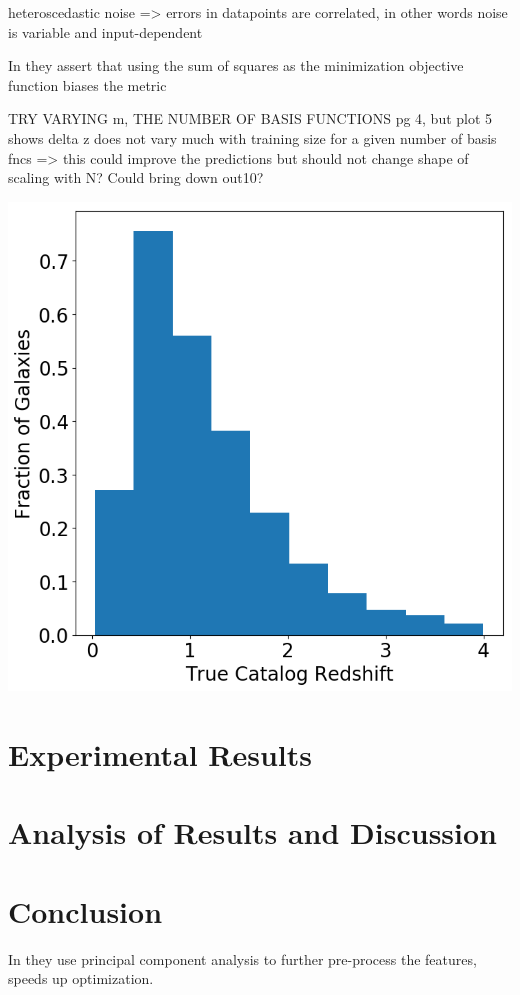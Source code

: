 \documentclass[13pt]{amsart}
\begin{document}
    heteroscedastic noise => errors in datapoints are correlated, in other words noise is variable and input-dependent

    In \cite{sgp} they assert that using the sum of squares as the minimization objective function biases the metric

    TRY VARYING m, THE NUMBER OF BASIS FUNCTIONS \cite{sgp} pg 4, but plot 5 shows delta z does not vary much with training size for a given number of basis fncs => this could improve the predictions but should not change shape of scaling with N? Could bring down out10?

    \includegraphics[width=1.\textwidth]{../plots/figure_true_redshift_histogram.png}



\section{Experimental Results}




\section{Analysis of Results and Discussion}



\section{Conclusion}
In \cite{gpz} they use principal component analysis to further pre-process the features, speeds up optimization.




\end{document}
